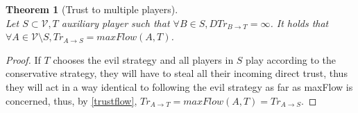 \documentclass[11pt]{article}
\newtheorem{theorem}{Theorem}[section]
\theoremstyle{definition}
\theoremstyle{corollary}
\theoremstyle{lemma}
\begin{document}
    \begin{theorem}[Trust to multiple players] \ \\
    \label{trustmany}
       Let $S \subset \mathcal{V}, T$ auxiliary player such that $\forall B \in S, DTr_{B \rightarrow T} = \infty$.
       It holds that $\forall A \in \mathcal{V} \setminus S, Tr_{A \rightarrow S} = maxFlow(A, T)$.
    \end{theorem}       
    \begin{proof}
       If $T$ chooses the evil strategy and all players in $S$ play according to the conservative strategy, they will have to steal
       all their incoming direct trust, thus they will act in a way identical to following the evil strategy as far as
       maxFlow is concerned, thus, by \ref{trustflow}, $Tr_{A \rightarrow T} = maxFlow(A, T) = Tr_{A \rightarrow S}$.
    \end{proof}
\end{document}
